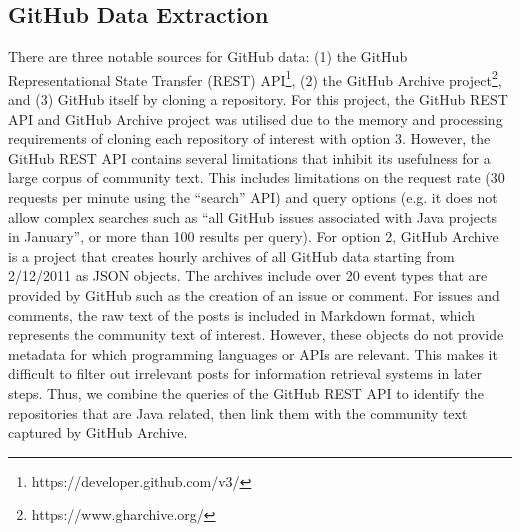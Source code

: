 \subsection{GitHub Data Extraction}
\label{subsec:info-github-extract}
There are three notable sources for GitHub data: (1) the GitHub Representational State Transfer (REST) API\footnote{https://developer.github.com/v3/}, (2) the GitHub Archive project\footnote{https://www.gharchive.org/}, and (3) GitHub itself by cloning a repository. For this project, the GitHub REST API and GitHub Archive project was utilised due to the memory and processing requirements of cloning each repository of interest with option 3. However, the GitHub REST API contains several limitations that inhibit its usefulness for a large corpus of community text. This includes limitations on the request rate (30 requests per minute using the ``search'' API) and query options (e.g. it does not allow complex searches such as ``all GitHub issues associated with Java projects in January'', or more than 100 results per query). For option 2, GitHub Archive is a project that creates hourly archives of all GitHub data starting from 2/12/2011 as JSON objects. The archives include over 20 event types that are provided by GitHub such as the creation of an issue or comment. For issues and comments, the raw text of the posts is included in Markdown format, which represents the community text of interest.  However, these objects do not provide metadata for which programming languages or APIs are relevant. This makes it difficult to filter out irrelevant posts for information retrieval systems in later steps.
Thus, we combine the queries of the GitHub REST API to identify the repositories that are Java related, then link them with the community text captured by GitHub Archive.\bigbreak

